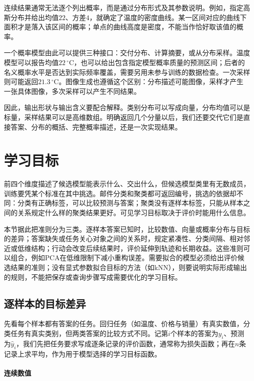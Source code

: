 连续结果通常无法逐个列出概率，而是通过分布形式及其参数说明。例如，指定高斯分布并给出均值$22$、方差$4$，就确定了温度的密度曲线。某一区间对应的曲线下面积才是落入该区间的概率；单点的曲线高度是密度，不能当作恰好取该值的概率。

一个概率模型由此可以提供三种接口：交付分布、计算摘要，或从分布采样。温度模型可以报告均值$22\,^{\circ}\mathrm{C}$，也可以给出包含指定模型概率质量的预测区间；后者的名义概率水平是否达到实际频率覆盖，需要另用未参与训练的数据检查。一次采样则可能返回$21.3\,^{\circ}\mathrm{C}$。图像生成也遵循这个区别：分布描述可能图像，采样才产生一张具体图像，多次采样可以产生不同结果。

因此，输出形状与输出含义要配合解释。类别分布可以写成向量，分布均值可以是标量，采样结果可以是高维数组。明确返回几个分量以后，我们还要交代它们是直接答案、分布的概括、完整概率描述，还是一次实现结果。

\section{学习目标}
\label{sec:models-objectives}

前四个维度描述了候选模型能表示什么、交出什么，但候选模型类里有无数成员，训练要凭某个标准在其中挑选。邮件分类和聚类都可返回编号，挑选的依据却不同：分类有正确标签，可以比较预测与答案；聚类没有逐样本标签，只能从样本之间的关系规定什么样的聚类结果更好。可见学习目标取决于评价时能用什么信息。

本节据此把准则分为三类。逐样本答案已知时，比较数值、向量或概率分布与目标的差异；答案缺失或任务关心对象之间的关系时，规定紧凑性、分类间隔、相对邻近或低维结构；行动会改变后续结果时，评价延伸到轨迹和长期收益。这些准则可以组合，例如PCA在低维限制下减小重构误差。需要拟合的模型必须给出评价候选结果的准则；没有显式参数拟合目标的方法（如kNN），则要说明实际形成输出的规则，不能把保存或查询步骤写成需要优化的学习目标。

\subsection{逐样本的目标差异}
\label{sec:models-pointwise-objectives}

先看每个样本都有答案的任务。回归任务（如温度、价格与销量）有真实数值，分类任务有真实类别，但两类答案的比较方式不同。记第$i$个样本的答案为$y_i$、预测为$\hat{y}_i$，我们先把任务要求写成逐条记录的评价函数，通常称为损失函数；再在$n$条记录上求平均，作为用于模型选择的学习目标函数。

\paragraph{连续数值}

